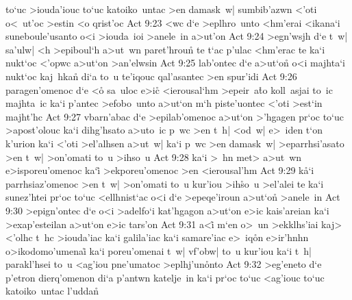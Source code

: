 to`uc
>iouda'iouc
to`uc
katoiko~untac
>en
damask~w|
sumbib'azwn
<'oti
o<~ut'oc
>estin
<o
qrist'oc\bibvsend
\vs Act 9:23
<wc
d`e
>eplhro~unto
<hm'erai
<ikana`i
suneboule'usanto
o<i
>iouda~ioi
>anele~in
a>ut'on\bibvsend
\vs Act 9:24
>egn'wsjh
d`e
t~w|
sa'ulw|
<h
>epiboul`h
a>ut~wn
paret'hroun\r{}
te
t`ac
p'ulac
<hm'erac
te
ka`i
nukt`oc
<'opwc
a>ut`on
>an'elwsin\bibvsend
\vs Act 9:25
lab'ontec
d`e
a>ut`on\r{}
o<i
majhta`i
nukt`oc
kaj~hkan\r{}
di`a
to~u
te'iqouc
qal'asantec
>en
spur'idi\bibvsend
\vs Act 9:26
paragen'omenoc
d`e
<o\r{}
sa~uloc
e>i\r{c}
<ierousal`hm
>epeir~a\r{t}o
koll~asjai
to~ic
majhta~ic
ka`i
p'antec
>efobo~unto
a>ut`on
m`h
piste'uontec
<'oti
>est`in
majht'hc\bibvsend
\vs Act 9:27
vbarn'abac
d`e
>epilab'omenoc
a>ut`on
>'hgagen
pr`oc
to`uc
>apost'olouc
ka`i
dihg'hsato
a>uto~ic
p~wc
>en
t~h|
<od~w|
e>~iden
t`on
k'urion
ka`i
<'oti
>el'alhsen
a>ut~w|
ka`i
p~wc
>en
damask~w|
>eparrhsi'asato
>en
t~w|
>on'omati
to~u
>ihso~u\bibvsend
\vs Act 9:28
ka`i
>~hn
met>
a>ut~wn
e>isporeu'omenoc
ka`i\r{}
>ekporeu'omenoc
>en
<ierousal'hm\bibvsend
\vs Act 9:29
k\r{a}`i
parrhsiaz'omenoc
>en
t~w|
>on'omati
to~u
kur'iou
>ih\r{s}o~u
>el'alei
te
ka`i
sunez'htei
pr`oc
to`uc
<ellhnist`ac
o<i
d`e
>epeqe'iroun
a>ut`on\r{}
>anele~in\bibvsend
\vs Act 9:30
>epign'ontec
d`e
o<i
>adelfo`i
kat'hgagon
a>ut`on
e>ic
kais'areian
ka`i
>exap'esteilan
a>ut`on
e>ic
tars'on\bibvsend
\vs Act 9:31
a<i\r{}
m`en
o>~un
>ekklhs'iai
kaj>
<'olhc
t~hc
>iouda'iac
ka`i
galila'iac
ka`i
samare'iac
e>~iq\r{o}n
e>ir'hnhn
o>ikodomo'umenai\r{}
ka`i
poreu'omenai
t~w|
vf'obw|
to~u
kur'iou
ka`i
t~h|
parakl'hsei
to~u
<ag'iou
pne'umatoc
>eplhj'un\r{o}nto\bibvsend
{}
\vs Act 9:32
>eg'eneto
d`e
p'etron
dierq'omenon
di`a
p'antwn
katelje~in
ka`i
pr`oc
to`uc
<ag'iouc
to`uc
katoiko~untac
l'udda\r{n}\bibvsend
{}
